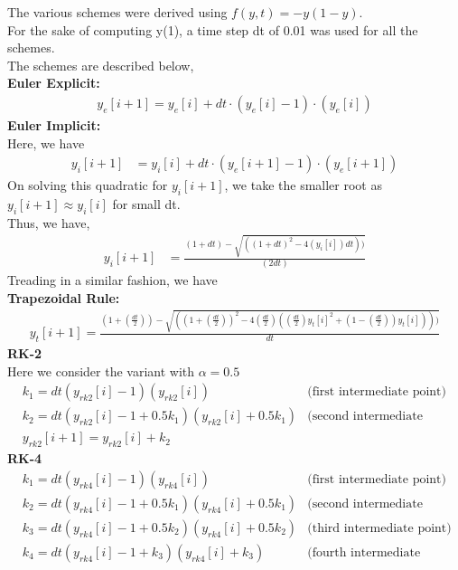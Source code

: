 \documentclass[letterpaper]{exam}
\begin{document}
\begin{questions}
\begin{solution}
The various schemes were derived using $f(y,t) = -y(1-y)$.\\
For the sake of computing y(1), a time step dt of 0.01 was used for all the schemes.\\
The schemes are described below,\\
\textbf{Euler Explicit:}\\
\begin{align}
    y_e[i+1] = y_e[i] + dt\cdot(y_e[i]-1)\cdot(y_e[i])
\end{align}
\textbf{Euler Implicit:}\\
Here, we have
\begin{align*}
    y_i[i+1] &= y_i[i] + dt\cdot(y_e[i+1]-1)\cdot(y_e[i+1])
\end{align*}
On solving this quadratic for $y_i[i+1]$, we take the smaller root as $y_i[i+1] \approx y_i[i]$ for small dt.\\
Thus, we have,
\begin{align}
   y_i[i+1] &=  \frac{(1+dt) -\sqrt{((1+dt)^2 - 4(y_i[i])dt))}}{(2dt)}
\end{align}
Treading in a similar fashion, we have\\
\textbf{Trapezoidal Rule:}\\
\begin{align}
  y_t[i+1] =   \frac{(1+(\frac{dt}{2})) - \sqrt{((1+(\frac{dt}{2}))^2 - 4(\frac{dt}{2})((\frac{dt}{2})y_t[i]^2 + (1-(\frac{dt}{2}))y_t[i])))}}{dt}
\end{align}
\textbf{RK-2}\\
Here we consider the variant with $\alpha = 0.5$
\begin{align}
    &k_1 = dt(y_{rk2}[i]-1)(y_{rk2}[i]) &\mbox{(first intermediate point)}\\
    &k_2 = dt(y_{rk2}[i]-1 + 0.5k_1)(y_{rk2}[i]+0.5k_1) &\mbox{(second intermediate point)}\\
    &y_{rk2}[i+1] = y_{rk2}[i] + k_2     
\end{align}
\textbf{RK-4}\\
\begin{align}
    &k_1 = dt(y_{rk4}[i]-1)(y_{rk4}[i]) &\mbox{(first intermediate point)}\\
    &k_2 = dt(y_{rk4}[i]-1 + 0.5k_1)(y_{rk4}[i]+0.5k_1) &\mbox{(second intermediate point)}\\
    &k_3 = dt(y_{rk4}[i]-1 + 0.5k_2)(y_{rk4}[i]+0.5k_2) &\mbox{(third intermediate point)}\\
    &k_4 = dt(y_{rk4}[i]-1 + k_3)(y_{rk4}[i]+k_3) &\mbox{(fourth intermediate point)}\\

\end{align}
\end{solution}
\end{questions}
\end{document}
